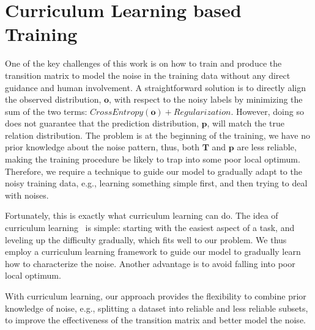 \section{Curriculum Learning based Training \label{sec:training}}

One of the key challenges of this work is  on how to train and produce the transition matrix to model the noise  in the training data without any direct guidance and human involvement.
A straightforward solution is to directly align the observed distribution, $\mathbf{o}$, with respect to the noisy labels by minimizing the sum of the two terms:
$CrossEntropy(\mathbf{o}) + Regularization$. However, doing so
does not guarantee that the prediction distribution, $\mathbf{p}$, will match the true relation distribution.
The problem is at the beginning of the training, we have no prior knowledge about the noise pattern, 
thus, both  $\mathbf{T}$ and $\mathbf{p}$ are less reliable, making the training procedure be likely to trap into some poor local optimum.
Therefore, we require a technique to guide our model to gradually adapt to the noisy training data, e.g., learning something simple first, and then trying to deal with noises.

Fortunately, this is exactly what curriculum learning can do.
The idea of curriculum learning~\cite{bengio2009curriculum} is simple: starting with the easiest aspect of a task, and leveling up the difficulty gradually,
which fits well to our problem.
We thus employ a curriculum
learning framework to guide our model to gradually learn how to characterize the noise. 
Another advantage is to avoid falling into poor local optimum.


With curriculum learning, our approach  provides the
flexibility to combine prior knowledge of noise, e.g., splitting a dataset into reliable and less reliable subsets,  to improve the
effectiveness of  the transition matrix and better model the noise.



